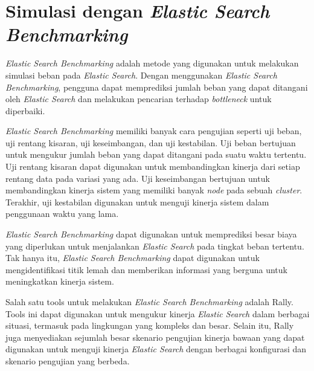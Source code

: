 \section{Simulasi dengan \textit{Elastic Search Benchmarking}}

\textit{Elastic Search Benchmarking} adalah metode yang digunakan untuk melakukan simulasi beban pada \textit{Elastic Search}. Dengan menggunakan \textit{Elastic Search Benchmarking}, pengguna dapat memprediksi jumlah beban yang dapat ditangani oleh \textit{Elastic Search} dan melakukan pencarian terhadap \textit{bottleneck} untuk diperbaiki.

\textit{Elastic Search Benchmarking} memiliki banyak cara pengujian seperti uji beban, uji rentang kisaran, uji keseimbangan, dan uji kestabilan. Uji beban bertujuan untuk mengukur jumlah beban yang dapat ditangani pada suatu waktu tertentu. Uji rentang kisaran dapat digunakan untuk membandingkan kinerja dari setiap rentang data pada variasi yang ada. Uji keseimbangan bertujuan untuk membandingkan kinerja sistem yang memiliki banyak \textit{node} pada sebuah \textit{cluster}. Terakhir, uji kestabilan digunakan untuk menguji kinerja sistem dalam penggunaan waktu yang lama.

\textit{Elastic Search Benchmarking} dapat digunakan untuk memprediksi besar biaya yang diperlukan untuk menjalankan \textit{Elastic Search} pada tingkat beban tertentu. Tak hanya itu, \textit{Elastic Search Benchmarking} dapat digunakan untuk mengidentifikasi titik lemah dan memberikan informasi yang berguna untuk meningkatkan kinerja sistem.

Salah satu tools untuk melakukan \textit{Elastic Search Benchmarking} adalah Rally. Tools ini dapat digunakan untuk mengukur kinerja \textit{Elastic Search} dalam berbagai situasi, termasuk pada lingkungan yang kompleks dan besar. Selain itu, Rally juga menyediakan sejumlah besar skenario pengujian kinerja bawaan yang dapat digunakan untuk menguji kinerja \textit{Elastic Search} dengan berbagai konfigurasi dan skenario pengujian yang berbeda. 